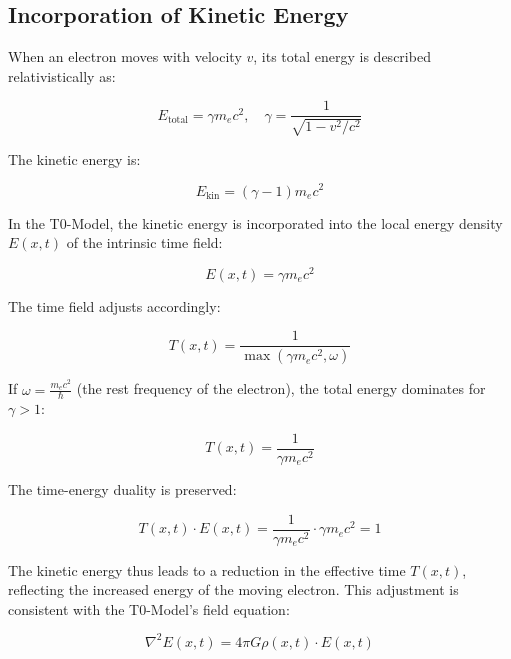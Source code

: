 \documentclass[12pt,a4paper]{article}
\begin{document}
	\subsection{Incorporation of Kinetic Energy}
	\label{subsec:electron_kinetic}
	
	When an electron moves with velocity \( v \), its total energy is described relativistically as:
	
	\begin{equation}
		E_{\text{total}} = \gamma m_e c^2, \quad \gamma = \frac{1}{\sqrt{1 - v^2/c^2}}
	\end{equation}
	
	The kinetic energy is:
	
	\begin{equation}
		E_{\text{kin}} = (\gamma - 1) m_e c^2
	\end{equation}
	
	In the T0-Model, the kinetic energy is incorporated into the local energy density \( E(x,t) \) of the intrinsic time field:
	
	\begin{equation}
		E(x,t) = \gamma m_e c^2
	\end{equation}
	
	The time field adjusts accordingly:
	
	\begin{equation}
		T(x,t) = \frac{1}{\max(\gamma m_e c^2, \omega)}
	\end{equation}
	
	If \(\omega = \frac{m_e c^2}{\hbar}\) (the rest frequency of the electron), the total energy dominates for \(\gamma > 1\):
	
	\begin{equation}
		T(x,t) = \frac{1}{\gamma m_e c^2}
	\end{equation}
	
	The time-energy duality is preserved:
	
	\begin{equation}
		T(x,t) \cdot E(x,t) = \frac{1}{\gamma m_e c^2} \cdot \gamma m_e c^2 = 1
	\end{equation}
	
	The kinetic energy thus leads to a reduction in the effective time \( T(x,t) \), reflecting the increased energy of the moving electron. This adjustment is consistent with the T0-Model's field equation:
	
	\begin{equation}
		\nabla^2 E(x,t) = 4\pi G \rho(x,t) \cdot E(x,t)
		\label{eq:energy_field_equation}
	\end{equation}
	
\end{document}
